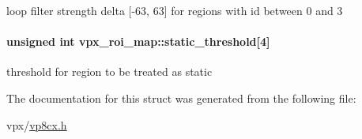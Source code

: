 loop filter strength delta \mbox{[}-\/63, 63\mbox{]} for regions with id between 0 and 3 \hypertarget{structvpx__roi__map_a3354ff458e229361b53a0b2d1bf68cfb}{
\paragraph[{static\-\_\-threshold}]{\setlength{\rightskip}{0pt plus 5cm}unsigned int vpx\-\_\-roi\-\_\-map\-::static\-\_\-threshold\mbox{[}4\mbox{]}}}\label{structvpx__roi__map_a3354ff458e229361b53a0b2d1bf68cfb}
threshold for region to be treated as static 

The documentation for this struct was generated from the following file\-:\begin{DoxyCompactItemize}
\item 
vpx/\hyperlink{vp8cx_8h}{vp8cx.\-h}\end{DoxyCompactItemize}
